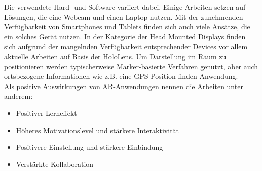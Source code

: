 Die verwendete Hard- und Software variiert dabei. Einige Arbeiten setzen auf Lösungen, die eine Webcam und einen Laptop nutzen. Mit der zunehmenden Verfügbarkeit von Smartphones und Tablets finden sich auch viele Ansätze, die ein solches Gerät nutzen. In der Kategorie der Head Mounted Displays finden sich aufgrund der mangelnden Verfügbarkeit entsprechender Devices vor allem aktuelle Arbeiten auf Basis der HoloLens. Um Darstellung im Raum zu positionieren werden typischerweise Marker-basierte Verfahren genutzt,  aber auch ortsbezogene Informationen wie z.B. eine GPS-Position finden Anwendung.\\

Als positive Auswirkungen von AR-Anwendungen nennen die Arbeiten unter anderem:
\begin{itemize}
	\setlength{\itemsep}{-5pt}
	\item Positiver Lerneffekt
	\item Höheres Motivationslevel und stärkere Interaktivität
	\item Positivere Einstellung und stärkere Einbindung
	\item Verstärkte Kollaboration
\end{itemize}


